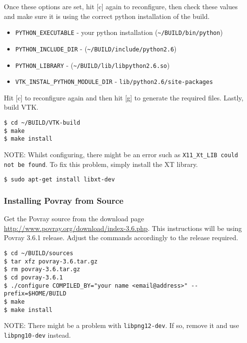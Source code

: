 Once these options are set, hit [c] again to reconfigure, then check these values and make sure it is using the correct python installation of the build.

\begin{itemize}[noitemsep,nolistsep]
	\item \lstinline{PYTHON_EXECUTABLE} - your python installation (\lstinline{~/BUILD/bin/python})
	\item \lstinline{PYTHON_INCLUDE_DIR} - (\lstinline{~/BUILD/include/python2.6})
	\item \lstinline{PYTHON_LIBRARY} - (\lstinline{~/BUILD/lib/libpython2.6.so})
	\item \lstinline{VTK_INSTAL_PYTHON_MODULE_DIR} - \lstinline{lib/python2.6/site-packages}
\end{itemize}

Hit [c] to reconfigure again and then hit [g] to generate the required files. Lastly, build VTK.

\begin{lstlisting}[style=inlineBash]
$ cd ~/BUILD/VTK-build
$ make
$ make install
\end{lstlisting}

NOTE: Whilst configuring, there might be an error such as \lstinline{X11_Xt_LIB could not be found}. To fix this problem, simply install the XT library.
\begin{lstlisting}[style=inlineBash]
$ sudo apt-get install libxt-dev
\end{lstlisting}

\subsubsection{Installing Povray from Source}
\label{sub:installing_povray_from_source}

Get the Povray source from the download page \url{http://www.povray.org/download/index-3.6.php}. This instructions will be using Povray 3.6.1 release. Adjust the commands accordingly to the release required.

\begin{lstlisting}[style=inlineBash]
$ cd ~/BUILD/sources
$ tar xfz povray-3.6.tar.gz
$ rm povray-3.6.tar.gz
$ cd povray-3.6.1
$ ./configure COMPILED_BY="your name <email@address>" --prefix=$HOME/BUILD 
$ make
$ make install
\end{lstlisting}

NOTE: There might be a problem with \lstinline{libpng12-dev}. If so, remove it and use \lstinline{libpng10-dev} instead.


